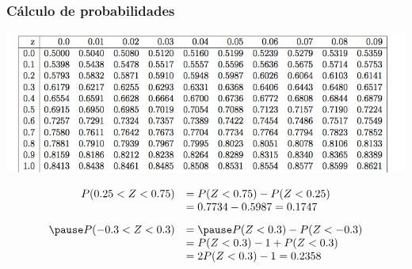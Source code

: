 \documentclass[handout]{beamer}\usepackage[]{graphicx}\usepackage[]{color}
\renewcommand{\leq}{\leqslant}
\renewcommand{\geq}{\geqslant}
\theoremstyle{plain}
\theoremstyle{definition}
\begin{document}
\begin{frame}
\frametitle{Cálculo de probabilidades}
\vspace*{-1cm}

\begin{center}
\hspace*{-0.4cm}\includegraphics[width=1.1\linewidth]{tabla.jpg}
\end{center}
$$
\begin{array}{rl}
P(0.25<Z<0.75) & =P(Z<0.75)-P(Z<0.25)\\ & =0.7734-0.5987=0.1747\\[2ex]\pause
P(-0.3<Z<0.3) & =\pause P(Z<0.3)-P(Z<-0.3)\\ & =P(Z<0.3)-1+P(Z<0.3)\\ & =2P(Z<0.3)-1=0.2358
\end{array}
$$
\end{frame}


%
%
\end{document}
